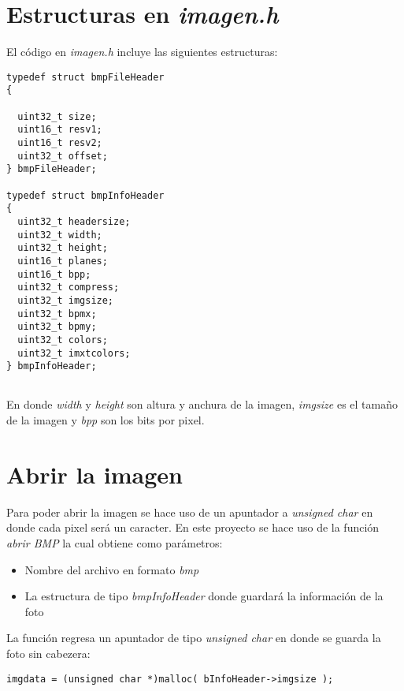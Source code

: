 \documentclass[11pt,a4paper]{article}
\begin{document}
\section{Estructuras en \textit{imagen.h}}
El código en \textit{imagen.h} incluye las siguientes estructuras:


\lstset{language=C, breaklines=true, basicstyle=\footnotesize}
\lstset{numbers=left, numberstyle=\tiny, stepnumber=1, numbersep=-2pt}
\begin{lstlisting}[frame=single]
typedef struct bmpFileHeader
{
  
  uint32_t size;        
  uint16_t resv1;       
  uint16_t resv2;       
  uint32_t offset;     
} bmpFileHeader;

typedef struct bmpInfoHeader
{
  uint32_t headersize;     
  uint32_t width;      
  uint32_t height;     
  uint16_t planes;         
  uint16_t bpp;             
  uint32_t compress;        
  uint32_t imgsize;     
  uint32_t bpmx;        
  uint32_t bpmy;       
  uint32_t colors;      
  uint32_t imxtcolors;     
} bmpInfoHeader;


\end{lstlisting}

En donde \textit{width} y \textit{height} son altura y anchura de la imagen, \textit{imgsize} es el tamaño de la imagen y \textit{bpp} son los bits por pixel.

\section{Abrir la imagen}

Para poder abrir la imagen se hace uso de un apuntador a \textit{unsigned char} en donde cada pixel será un caracter. En este proyecto se hace uso de la función \textit{abrir BMP} la cual obtiene como parámetros:

\begin{itemize}
\item Nombre del archivo en formato \textit{bmp}
\item La estructura de tipo \textit{bmpInfoHeader} donde guardará la información de la foto
\end{itemize}

La función regresa un apuntador de tipo \textit{unsigned char} en donde se guarda la foto sin cabezera:



\lstset{language=C, breaklines=true, basicstyle=\footnotesize}
\lstset{numbers=left, numberstyle=\tiny, stepnumber=1, numbersep=-2pt}
\begin{lstlisting}[frame=single]
imgdata = (unsigned char *)malloc( bInfoHeader->imgsize );
\end{lstlisting}
\end{document}
